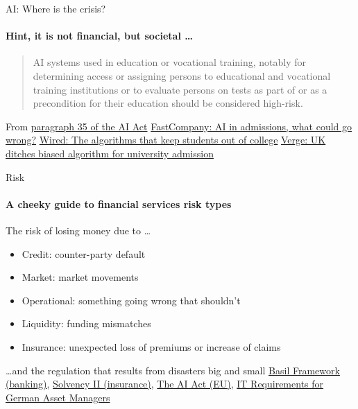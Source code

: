 \begin{frame}{AI: Where is the crisis?}
  \framesubtitle{Hint, it is not financial, but societal \ldots}
  \begin{quotation}
    AI systems used in education or vocational training, notably for determining access or assigning persons to educational and vocational training institutions or to evaluate persons on tests as part of or as a precondition for their education should be considered high-risk.
  \end{quotation}
  From \href{https://eur-lex.europa.eu/resource.html?uri=cellar:e0649735-a372-11eb-9585-01aa75ed71a1.0001.02/DOC_1&format=PDF}{paragraph 35 of the AI Act}
  \newline
  \href{https://www.fastcompany.com/90342596/schools-are-quietly-turning-to-ai-to-help-pick-who-gets-in-what-could-go-wrong}{FastCompany: AI in admissions, what could go wrong?}
  \newline
  \href{https://www.wired.com/story/algorithm-set-students-grades-altered-futures/}{Wired: The algorithms that keep students out of college}
  \newline
  \href{https://www.theverge.com/2020/8/17/21372045/uk-a-level-results-algorithm-biased-coronavirus-covid-19-pandemic-university-applications}{Verge: UK ditches biased algorithm for university admission}

\end{frame}

\begin{frame}{Risk}
  \framesubtitle{A cheeky guide to financial services risk types}
  \begin{block}{The risk of losing money due to \ldots}
    \begin{itemize}
      \item Credit: counter-party default
      \item Market: market movements
      \item Operational: something going wrong that shouldn't
      \item Liquidity: funding mismatches
      \item Insurance: unexpected loss of premiums or increase of claims
    \end{itemize}
  \end{block}

  \begin{block}{\ldots and the regulation that results from disasters big and small}
    \href{https://www.bis.org/basel_framework/}{Basil Framework (banking)},
    \href{https://www.eiopa.europa.eu/browse/solvency-2_en}{Solvency II (insurance)},
    \href{https://eur-lex.europa.eu/legal-content/EN/TXT/PDF/?uri=CELEX\%3A52021PC0206}{The AI Act (EU)},
    \href{https://www.bafin.de/SharedDocs/Veroeffentlichungen/EN/Meldung/2020/meldung\_2020\_05\_25\_KAIT\_en.html}{IT Requirements for German Asset Managers}
  \end{block}
\end{frame}

